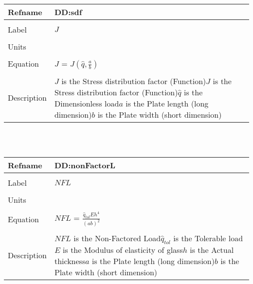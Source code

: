 \documentclass[12pt]{article}
\begin{document}
~\newline
\noindent \begin{minipage}{\textwidth}
\begin{tabular}{p{} p{}}
\toprule \textbf{Refname} & \textbf{DD:sdf}
\label{DD:sdf}
\\ \midrule \\
Label & $J$
\\ \midrule \\
Units & 
\\ \midrule \\
Equation & $J$ = $J(\hat{q},\frac{a}{b})$
\\ \midrule \\
Description & $J$ is the Stress distribution factor (Function)\newline$J$ is the Stress distribution factor (Function)\newline$\hat{q}$ is the Dimensionless load\newline$a$ is the Plate length (long dimension)\newline$b$ is the Plate width (short dimension)
\\ \bottomrule \end{tabular}
\end{minipage}\\
~\newline
\noindent \begin{minipage}{\textwidth}
\begin{tabular}{p{} p{}}
\toprule \textbf{Refname} & \textbf{DD:nonFactorL}
\label{DD:nonFactorL}
\\ \midrule \\
Label & $NFL$
\\ \midrule \\
Units & 
\\ \midrule \\
Equation & $NFL$ = $\frac{\hat{q}_{tol}Eh^{4}}{(ab)^{2}}$
\\ \midrule \\
Description & $NFL$ is the Non-Factored Load\newline$\hat{q}_{tol}$ is the Tolerable load\newline$E$ is the Modulus of elasticity of glass\newline$h$ is the Actual thickness\newline$a$ is the Plate length (long dimension)\newline$b$ is the Plate width (short dimension)
\\ \bottomrule \end{tabular}
\end{minipage}\\
\end{document}

